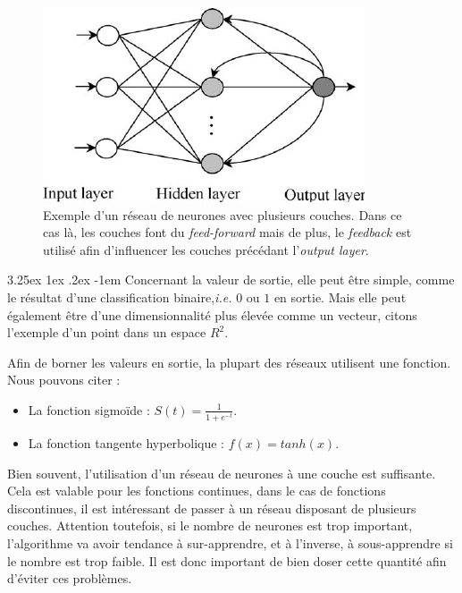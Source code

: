 \documentclass[a4paper, 11pt]{article}
\makeatletter
\renewcommand\paragraph{\@startsection{paragraph}{5}{\z@}%
  {3.25ex \@plus1ex \@minus.2ex}%
  {-1em}%
  {\normalfont\normalsize\bfseries}}
\makeatother
\begin{document}
\begin{figure}[H]
\centering
\includegraphics{images/neural_net_feedback}
\caption[]{Exemple d'un réseau de neurones avec plusieurs couches. Dans ce cas là,
les couches font du \textit{feed-forward} mais de plus, le \textit{feedback} est utilisé afin
d'influencer les couches précédant l'\textit{output layer}.\footnotemark}
\end{figure}


\paragraph{}
Concernant la valeur de sortie, elle peut être simple, comme le résultat d'une classification binaire,\textit{i.e.} $0$ ou $1$
en sortie. Mais elle peut également être d'une dimensionnalité plus élevée comme un vecteur, citons l'exemple d'un point
dans un espace $R^2$.

Afin de borner les valeurs en sortie, la plupart des réseaux utilisent une fonction. Nous pouvons citer :
\begin{itemize}
\item La fonction sigmoïde : $S(t) = \frac{1}{1 + e^{-t}}$.
\item La fonction tangente hyperbolique : $f(x) = tanh(x)$.
\end{itemize}

Bien souvent, l'utilisation d'un réseau de neurones à une couche est suffisante. Cela est valable pour les fonctions continues,
dans le cas de fonctions discontinues, il est intéressant de passer à un réseau disposant de plusieurs couches.
Attention toutefois, si le nombre de neurones est trop important, l'algorithme va avoir tendance à sur-apprendre,
et à l'inverse, à sous-apprendre si le nombre est trop faible. Il est donc important de bien doser cette quantité afin
d'éviter ces problèmes.
\end{document}
